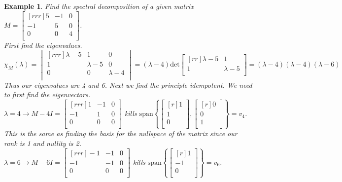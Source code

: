 \documentclass{report}
\newtheorem*{ex}{Example}
\begin{document}
\begin{ex}
Find the spectral decomposition of a given matrix $M=\begin{bmatrix}[rrr]5&-1&0\\-1&5&0\\0&0&4\\\end{bmatrix}$.\\
First find the eigenvalues.
\[ \chi_M(\lambda) = \begin{vmatrix}[rrr]\lambda-5&1&0\\1&\lambda-5&0\\0&0&\lambda-4\\\end{vmatrix} = (\lambda-4)\mathrm{det}\begin{bmatrix}[rr]\lambda-5&1\\1&\lambda-5\\\end{bmatrix} = (\lambda-4)(\lambda-4)(\lambda-6) \]
Thus our eigenvalues are 4 and 6. Next we find the principle idempotent. We need to first find the eigenvectors.\\
$\lambda=4\rightarrow M-4I=\begin{bmatrix}[rrr]1&-1&0\\-1&1&0\\0&0&0\\\end{bmatrix}$ kills $\mathrm{span}\left\{ \begin{bmatrix}[r]1\\1\\0\\\end{bmatrix},\begin{bmatrix}[r]0\\0\\1\\\end{bmatrix}\right\} = v_4$. This is the same as finding the basis for the nullspace of the matrix since our rank is 1 and nullity is 2.\\
$\lambda=6\rightarrow M-6I=\begin{bmatrix}[rrr]-1&-1&0\\-1&-1&0\\0&0&0\\\end{bmatrix}$ kills $\mathrm{span}\left\{\begin{bmatrix}[r]1\\-1\\0\\\end{bmatrix}\right\} = v_6$.\\

\end{ex}
\end{document}
